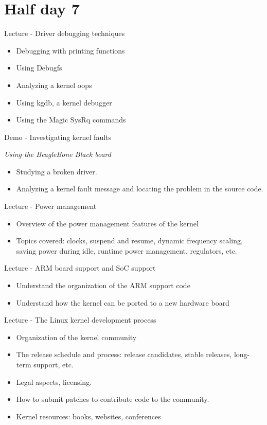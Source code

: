 \documentclass[a4paper,12pt,obeyspaces,spaces,hyphens]{article}
\begin{document}
\section{Half day 7}
\feagendatwocolumn
{Lecture - Driver debugging techniques}
{
  \begin{itemize}
  \item Debugging with printing functions
  \item Using Debugfs
  \item Analyzing a kernel oops
  \item Using kgdb, a kernel debugger
  \item Using the Magic SysRq commands
  \end{itemize}
}
{Demo - Investigating kernel faults}
{
  {\em Using the BeagleBone Black board}
  \begin{itemize}
  \item Studying a broken driver.
  \item Analyzing a kernel fault message and locating the problem in the
    source code.
  \end{itemize}
}

\feagendatwocolumn
{Lecture - Power management}
{
  \begin{itemize}
  \item Overview of the power management features of the kernel
  \item Topics covered: clocks, suspend and resume, dynamic frequency
    scaling, saving power during idle, runtime power management,
    regulators, etc.
  \end{itemize}
}
{Lecture - ARM board support and SoC support}
{
  \begin{itemize}
  \item Understand the organization of the ARM support code
  \item Understand how the kernel can be ported to a new hardware
    board
  \end{itemize}
}

\feagendaonecolumn
{Lecture - The Linux kernel development process}
{
  \begin{itemize}
  \item Organization of the kernel community
  \item The release schedule and process: release candidates, stable
    releases, long-term support, etc.
  \item Legal aspects, licensing.
  \item How to submit patches to contribute code to the community.
  \item Kernel resources: books, websites, conferences
  \end{itemize}
}
\end{document}
